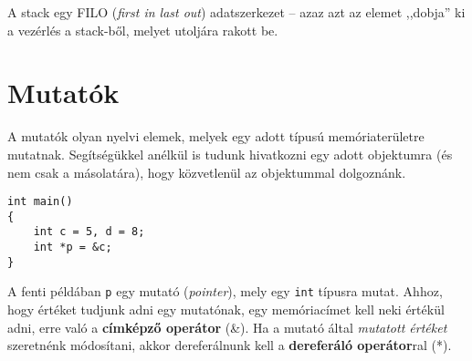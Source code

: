 \documentclass[a4paper,11.5pt,table]{article}
\begin{document}
	A stack egy FILO (\textit{first in last out}) adatszerkezet -- azaz azt az elemet ,,dobja'' ki a vezérlés a stack-ből, melyet utoljára rakott be.
	\section{Mutatók}
	A mutatók olyan nyelvi elemek, melyek egy adott típusú memóriaterületre mutatnak. Segítségükkel anélkül is tudunk hivatkozni egy adott objektumra (és nem csak a másolatára), hogy közvetlenül az objektummal dolgoznánk.
	\begin{lstlisting}
int main()
{
	int c = 5, d = 8;
	int *p = &c;
}
	\end{lstlisting}
	A fenti példában \texttt{p} egy mutató (\textit{pointer}), mely egy \texttt{int} típusra mutat. Ahhoz, hogy értéket tudjunk adni egy mutatónak, egy memóriacímet kell neki értékül adni, erre való a \textbf{címképző operátor} (\&). Ha a mutató által \textit{mutatott értéket} szeretnénk módosítani, akkor dereferálnunk kell a \textbf{dereferáló operátor}ral (*).
	
\end{document}
